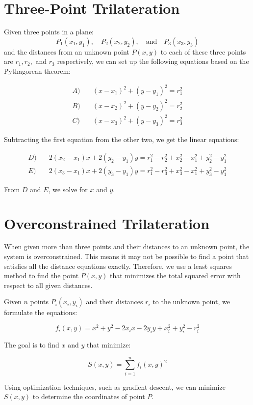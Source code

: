 \documentclass{article}
\begin{document}
\section*{Three-Point Trilateration}

Given three points in a plane: 
\[ P_1(x_1, y_1), \quad P_2(x_2, y_2), \quad \text{and} \quad P_3(x_3, y_3) \]
and the distances from an unknown point \( P(x, y) \) to each of these three points are \( r_1, r_2, \) and \( r_3 \) respectively, we can set up the following equations based on the Pythagorean theorem:

\begin{align*}
A) & \quad (x - x_1)^2 + (y - y_1)^2 = r_1^2 \\
B) & \quad (x - x_2)^2 + (y - y_2)^2 = r_2^2 \\
C) & \quad (x - x_3)^2 + (y - y_3)^2 = r_3^2
\end{align*}

Subtracting the first equation from the other two, we get the linear equations:

\begin{align*}
D) & \quad 2(x_2 - x_1)x + 2(y_2 - y_1)y = r_1^2 - r_2^2 + x_2^2 - x_1^2 + y_2^2 - y_1^2 \\
E) & \quad 2(x_3 - x_1)x + 2(y_3 - y_1)y = r_1^2 - r_3^2 + x_3^2 - x_1^2 + y_3^2 - y_1^2
\end{align*}

From \(D\) and \(E\), we solve for \(x\) and \(y\).

\section*{Overconstrained Trilateration}

When given more than three points and their distances to an unknown point, the system is overconstrained. This means it may not be possible to find a point that satisfies all the distance equations exactly. Therefore, we use a least squares method to find the point \( P(x, y) \) that minimizes the total squared error with respect to all given distances.

Given \( n \) points \( P_i(x_i, y_i) \) and their distances \( r_i \) to the unknown point, we formulate the equations:

\[ f_i(x, y) = x^2 + y^2 - 2x_i x - 2y_i y + x_i^2 + y_i^2 - r_i^2 \]

The goal is to find \(x\) and \(y\) that minimize:

\[ S(x, y) = \sum_{i=1}^n f_i(x, y)^2 \]

Using optimization techniques, such as gradient descent, we can minimize \( S(x, y) \) to determine the coordinates of point \( P \).
\end{document}
